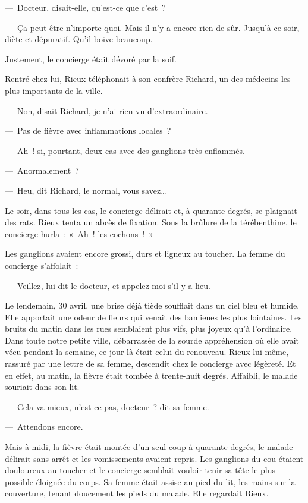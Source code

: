 \documentclass[french,twoside]{book} %
\begin{document}
— Docteur, disait-elle, qu’est-ce que c’est ?\par
— Ça peut être n’importe quoi. Mais il n’y a encore rien de sûr. Jusqu’à ce soir, diète et dépuratif. Qu’il boive beaucoup.\par
Justement, le concierge était dévoré par la soif.\par
Rentré chez lui, Rieux téléphonait à son confrère Richard, un des médecins les plus importants de la ville.\par
— Non, disait Richard, je n’ai rien vu d’extraordinaire.\par
— Pas de fièvre avec inflammations locales ?\par
— Ah ! si, pourtant, deux cas avec des ganglions très enflammés.\par
— Anormalement ?\par
— Heu, dit Richard, le normal, vous savez…\par
Le soir, dans tous les cas, le concierge délirait et, à quarante degrés, se plaignait des rats. Rieux tenta un abcès de fixation. Sous la brûlure de la térébenthine, le concierge hurla : « Ah ! les cochons ! »\par
Les ganglions avaient encore grossi, durs et ligneux au toucher. La femme du concierge s’affolait :\par
— Veillez, lui dit le docteur, et appelez-moi s’il y a lieu.\par
Le lendemain, 30 avril, une brise déjà tiède soufflait dans un ciel bleu et humide. Elle apportait une odeur de fleurs qui venait des banlieues les plus lointaines. Les bruits du matin dans les rues semblaient plus vifs, plus joyeux qu’à l’ordinaire. Dans toute notre petite ville, débarrassée de la sourde appréhension où elle avait vécu pendant la semaine, ce jour-là était celui du renouveau. Rieux lui-même, rassuré par une lettre de sa femme, descendit chez le concierge avec légèreté. Et en effet, au matin, la fièvre était tombée à trente-huit degrés. Affaibli, le malade souriait dans son lit.\par
— Cela va mieux, n’est-ce pas, docteur ? dit sa femme.\par
— Attendons encore.\par
Mais à midi, la fièvre était montée d’un seul coup à quarante degrés, le malade délirait sans arrêt et les vomissements avaient repris. Les ganglions du cou étaient douloureux au toucher et le concierge semblait vouloir tenir sa tête le plus possible éloignée du corps. Sa femme était assise au pied du lit, les mains sur la couverture, tenant doucement les pieds du malade. Elle regardait Rieux.\par
\end{document}
